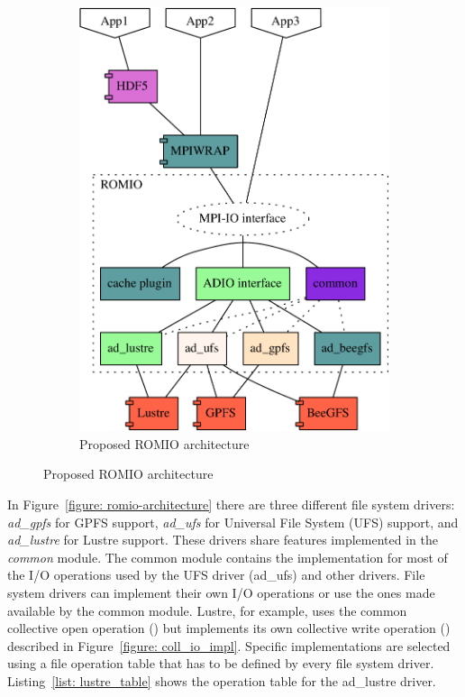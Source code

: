 \begin{figure}[!htb]
\begin{subfigure}[t]{0.55\textwidth}
  \includegraphics[width=\textwidth]{chapters/chapter3/figures/new-romio-architecture-src.pdf}
  \caption{Proposed ROMIO architecture}
  \label{figure: new-romio-architecture}
  \end{subfigure}
\end{figure}

In Figure~\ref{figure: romio-architecture} there are three different file system drivers: \textit{ad\_gpfs} for GPFS support, \textit{ad\_ufs} for Universal File System (UFS) support, and \textit{ad\_lustre} for Lustre support. These drivers share features 
implemented in the \textit{common} module. The common module contains the implementation for most of the I/O operations used by the UFS driver (ad\_ufs) and other drivers. File system drivers can implement their own I/O operations or use the ones made available 
by the common module. Lustre, for example, uses the common collective open operation () but implements its own collective write operation () described in Figure~\ref{figure: coll_io_impl}. 
Specific implementations are selected using a file operation table that has to be defined by every file system driver. Listing~\ref{list: lustre_table} shows the operation table for the ad\_lustre driver.

